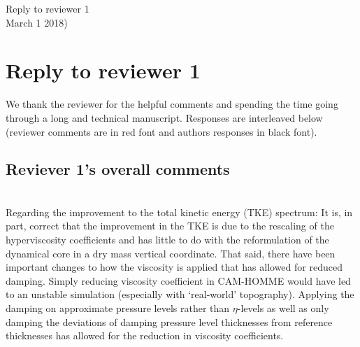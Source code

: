 \documentclass[11pt]{article}
\begin{document}
\begin{center}
 {\large   \sf Reply to reviewer 1}\\
    \vspace{.1in}
    March 1 2018)
  \end{center}
\section{Reply to reviewer 1}
We thank the reviewer for the helpful comments and spending the time going through a long and technical manuscript. Responses are interleaved below (reviewer comments are in red font and authors responses in black font). 
\subsection{Reviever 1's overall comments}
{\color{red}{
This is a well-written and mostly comprehensive paper describing a new dynamical core, and should be published to document the advances described within and the dynamical core characteristics.}}

{\color{red}{
 I do feel that some of the major changes compared with the earlier CAM-HOMME are not well-justified, while some of the improvements demonstrated (especially with regard to the kinetic energy spectrum) are a re-configuration of the model and not intrinsic to the core formulation.}}\\

Regarding the improvement to the total kinetic energy (TKE) spectrum: It is, in part, correct that the improvement in the TKE is due to the rescaling of the hyperviscosity coefficients and has little to do with the reformulation of the dynamical core in a dry mass vertical coordinate. That said, there have been important changes to how the viscosity is applied that has allowed for reduced damping. Simply reducing viscosity coefficient in CAM-HOMME would have led to an unstable simulation (especially with `real-world' topography). Applying the damping on approximate pressure levels rather than $\eta$-levels as well as only damping the deviations of damping pressure level thicknesses from reference thicknesses has allowed for the reduction in viscosity coefficients.\\
\end{document}
